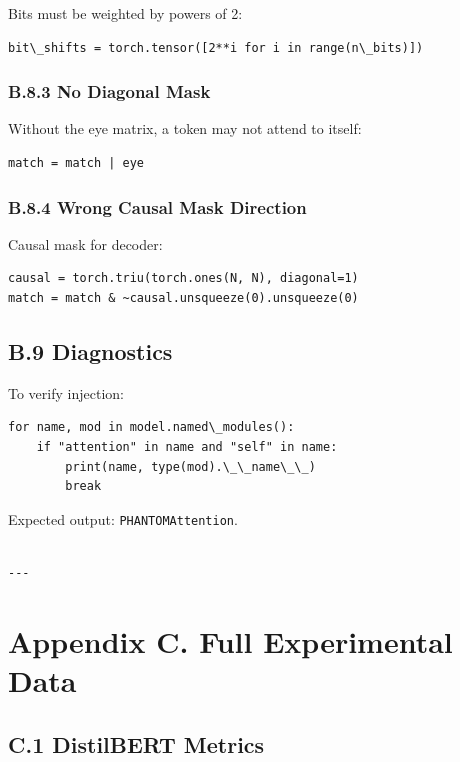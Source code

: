 Bits must be weighted by powers of 2:

\begin{lstlisting}
bit\_shifts = torch.tensor([2**i for i in range(n\_bits)])
\end{lstlisting}

\subsubsection{B.8.3 No Diagonal Mask}

Without the eye matrix, a token may not attend to itself:

\begin{lstlisting}
match = match | eye
\end{lstlisting}

\subsubsection{B.8.4 Wrong Causal Mask Direction}

Causal mask for decoder:

\begin{lstlisting}
causal = torch.triu(torch.ones(N, N), diagonal=1)
match = match & ~causal.unsqueeze(0).unsqueeze(0)
\end{lstlisting}

\subsection{B.9 Diagnostics}

To verify injection:

\begin{lstlisting}
for name, mod in model.named\_modules():
    if "attention" in name and "self" in name:
        print(name, type(mod).\_\_name\_\_)
        break
\end{lstlisting}

Expected output: \texttt{PHANTOMAttention}.
\begin{lstlisting}

---
\end{lstlisting}


\section{Appendix C. Full Experimental Data}

\subsection{C.1 DistilBERT Metrics}

